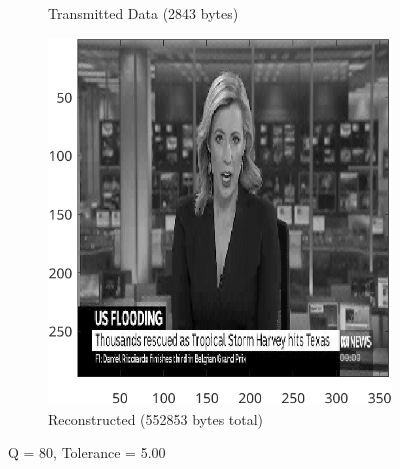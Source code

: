 \documentclass{article}
\begin{document}
\begin{figure}[ht]
\begin{subfigure}[t]{0.45\textwidth}
			\caption{Transmitted Data (2843 bytes)}
			\label{fig:2B_Tolerance5TD}

		\end{subfigure}
		\hspace{1cm}
		\begin{subfigure}[t]{0.45\textwidth}
			\centering

			\includegraphics[width=\textwidth]{2B_Tolerance5Reconstructed}

			\caption{Reconstructed (552853 bytes total)}
			\label{fig:2B_Tolerance5Reconstructed}

		\end{subfigure}

		\caption{Q = 80, Tolerance = 5.00}
		\label{fig:2B_Tolerance5}
	\end{figure}
\end{document}
